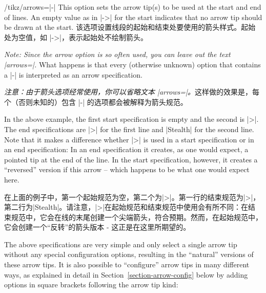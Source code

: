 \begin{key}{/tikz/arrows=|-|}
    This option sets the arrow tip(s) to be used at the start and end of lines.
    An empty value as in |->| for the start indicates that no arrow tip should
    be drawn at the start.%
    该选项设置线段的起始和结束处要使用的箭头样式。起始处为空值，如 |->|，表示起始处不绘制箭头。%

    \emph{Note: Since the arrow option is so often used, you can leave out the
    text |arrows=|.} What happens is that every (otherwise unknown) option that
    contains a |-| is interpreted as an arrow specification.

    \emph{注意：由于箭头选项经常使用，你可以省略文本 |arrows=|。}这样做的效果是，每个（否则未知的）包含 |-| 的选项都会被解释为箭头规范。%


\begin{codeexample}[preamble={\usetikzlibrary{arrows.meta}}]
\end{codeexample}

    In the above example, the first start specification is empty and the second
    is |>|. The end specifications are |>| for the first line and |Stealth| for
    the second line. Note that it makes a difference whether |>| is used in a
    start specification or in an end specification: In an end specification it
    creates, as one would expect, a pointed tip  at the end of the line. In the
    start specification, however, it creates a ``reversed'' version if this
    arrow -- which happens to be what one would expect here.

    在上面的例子中，第一个起始规范为空，第二个为|>|。第一行的结束规范为|>|，第二行为|Stealth|。请注意，|>|在起始规范和结束规范中使用会有所不同：在结束规范中，它会在线的末尾创建一个尖端箭头，符合预期。然而，在起始规范中，它会创建一个“反转”的箭头版本 - 这正是在这里所期望的。

The above specifications are very simple and only select a single arrow tip
    without any special configuration options, resulting in the ``natural''
    versions of these arrow tips. It is also possible to ``configure'' arrow
    tips in many different ways, as explained in detail in
    Section~\ref{section-arrow-config} below by adding options in square
    brackets following the arrow tip kind:
    

\end{key}

